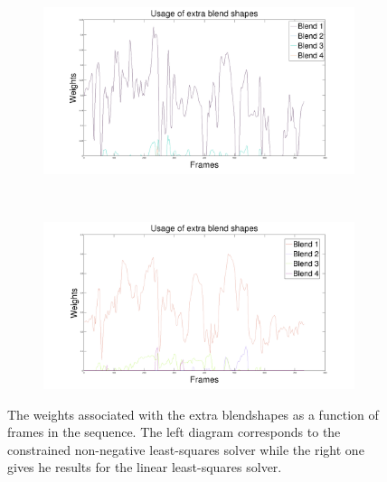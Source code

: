 \begin{figure}[htbp!]
        \centering
        \begin{subfigure}[b]{0.47\textwidth}
                \includegraphics[trim = 10mm 0mm 10mm 0mm,clip,width=\textwidth]{img/weights/3D/Extrafaces/w2_72_usage.png}
        \end{subfigure}
        ~ %
        \begin{subfigure}[b]{0.47\textwidth}
                \includegraphics[trim = 10mm 0mm 10mm 0mm,clip,width=\textwidth]{img/weights/3D/Extrafaces/w3_72_usage.png}
        \end{subfigure}
        \caption{The weights associated with the extra blendshapes as a function of frames in the sequence. The left diagram corresponds to the constrained non-negative least-squares solver while the right one gives he results for the linear least-squares solver.}\label{fig:usage}
\end{figure}
